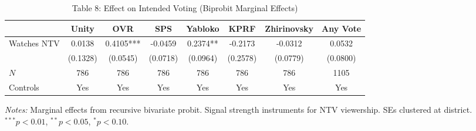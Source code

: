 \begin{table}[htbp]
\centering
\caption{Table 8: Effect on Intended Voting (Biprobit Marginal Effects)}
\label{tab:enik_table8}
\begin{adjustbox}{max width=\textwidth}
\begin{tabular}{lccccccc}
\toprule
 & Unity & OVR & SPS & Yabloko & KPRF & Zhirinovsky & Any Vote \\
\midrule
Watches NTV & 0.0138 & 0.4105*** & -0.0459 & 0.2374** & -0.2173 & -0.0312 & 0.0532 \\
 & (0.1328) & (0.0545) & (0.0718) & (0.0964) & (0.2578) & (0.0779) & (0.0800) \\
$N$ & 786 & 786 & 786 & 786 & 786 & 786 & 1105 \\
\midrule
Controls & Yes & Yes & Yes & Yes & Yes & Yes & Yes \\
\bottomrule
\end{tabular}
\end{adjustbox}
\parbox{\textwidth}{\footnotesize\textit{Notes:} Marginal effects from recursive bivariate probit. Signal strength instruments for NTV viewership. SEs clustered at district. $^{***}p<0.01$, $^{**}p<0.05$, $^{*}p<0.10$.}
\end{table}